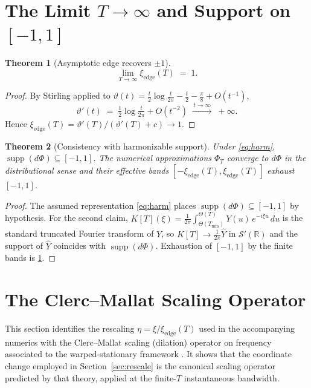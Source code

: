 \documentclass[11pt,a4paper]{article}
\theoremstyle{plain}
\newtheorem{theorem}{Theorem}
\theoremstyle{definition}
\newcommand{\R}{\mathbb{R}}
\DeclareMathOperator{\supp}{supp}
\begin{document}
\section{The Limit $T\to\infty$ and Support on $[-1,1]$}

\begin{theorem}[Asymptotic edge recovers $\pm 1$]\label{thm:edgelimit}
\[
\lim_{T\to\infty}\xi_{\mathrm{edge}}(T) \;=\; 1 .
\]
\end{theorem}

\begin{proof}
By Stirling applied to $\vartheta(t) = \tfrac{t}{2}\log\tfrac{t}{2\pi}-\tfrac{t}{2}-\tfrac{\pi}{8}+O(t^{-1})$,
\[
\vartheta'(t) \;=\; \tfrac12\log\tfrac{t}{2\pi} + O(t^{-2}) \;\xrightarrow{\,t\to\infty\,}\;+\infty .
\]
Hence $\xi_{\mathrm{edge}}(T)=\vartheta'(T)/(\vartheta'(T)+c)\to 1$.
\end{proof}

\begin{theorem}[Consistency with harmonizable support]\label{thm:consistency}
Under \eqref{eq:harm}, $\supp(d\Phi)\subseteq[-1,1]$. The numerical approximations $\Phi_T$ converge to $d\Phi$ in the distributional sense and their effective bands $[-\xi_{\mathrm{edge}}(T),\xi_{\mathrm{edge}}(T)]$ exhaust $[-1,1]$.
\end{theorem}

\begin{proof}
The assumed representation \eqref{eq:harm} places $\supp(d\Phi)\subseteq[-1,1]$ by hypothesis. For the second claim, $K[T](\xi) = \tfrac{1}{2\pi}\int_{\Theta(T_{\min})}^{\Theta(T)} Y(u)\,e^{-i\xi u}\,du$ is the standard truncated Fourier transform of $Y$, so $K[T]\to\tfrac{1}{2\pi}\widehat{Y}$ in $\mathscr{S}'(\R)$ and the support of $\widehat{Y}$ coincides with $\supp(d\Phi)$. Exhaustion of $[-1,1]$ by the finite bands is \ref{thm:edgelimit}.
\end{proof}

\section{The Clerc--Mallat Scaling Operator}\label{sec:CM}

This section identifies the rescaling $\eta=\xi/\xi_{\mathrm{edge}}(T)$ used in the accompanying numerics with the Clerc--Mallat scaling (dilation) operator on frequency associated to the warped-stationary framework \cite{ClercMallat}. It shows that the coordinate change employed in Section~\ref{sec:rescale} is the canonical scaling operator predicted by that theory, applied at the finite-$T$ instantaneous bandwidth.
\end{document}

